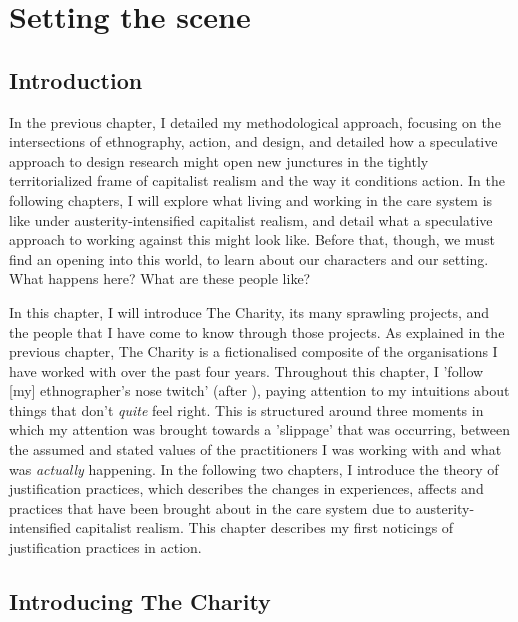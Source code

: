 \chapter{Setting the scene}
\label{4}

\section{Introduction}
\label{4-intro}

In the previous chapter, I detailed my methodological approach, focusing on the intersections of ethnography, action, and design, and detailed how a speculative approach to design research might open new junctures in the tightly territorialized frame of capitalist realism and the way it conditions action. In the following chapters, I will explore what living and working in the care system is like under austerity-intensified capitalist realism, and detail what a speculative approach to working against this might look like. Before that, though, we must find an opening into this world, to learn about our characters and our setting. What happens here? What are these people like? 

In this chapter, I will introduce The Charity, its many sprawling projects, and the people that I have come to know through those projects. As explained in the previous chapter, The Charity is a fictionalised composite of the organisations I have worked with over the past four years. Throughout this chapter, I 'follow [my] ethnographer’s nose twitch' (after \cite{leigh_star_this_2010}), paying attention to my intuitions about things that don’t \textit{quite} feel right. This is structured around three moments in which my attention was brought towards a 'slippage' \citep{cutting_making_2021} that was occurring, between the assumed and stated values of the practitioners I was working with and what was \textit{actually} happening. In the following two chapters, I introduce the theory of justification practices, which describes the  changes in experiences, affects and practices that have been brought about in the care system due to austerity-intensified capitalist realism. This chapter describes my first noticings of justification practices in action.

\section{Introducing The Charity}

